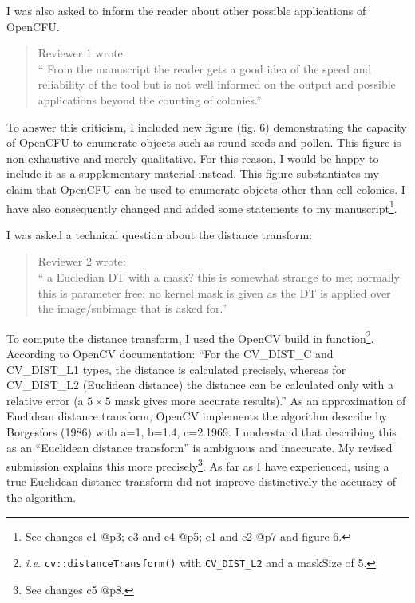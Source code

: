 \documentclass{letter}
\makeatletter
\newcommand{\CVersatDescrib}{c1 @p3; c3 and c4 @p5; c1 and c2 @p7 and figure 6}
\newcommand{\CDTDescrib}{c5 @p8}
\makeatother
\begin{document}
\begin{letter}{}
I was also asked to inform the reader about other possible applications
of OpenCFU.
\begin{quote}
Reviewer 1 wrote:\\
``  From the manuscript the reader gets a good idea of the speed and
 reliability of the tool but is not well 
informed on the output and possible applications beyond the counting of colonies.''
\end{quote}
To answer this criticism, I included 
new figure (fig. 6) demonstrating the capacity of OpenCFU to 
enumerate objects such as round seeds and pollen. This figure is
non exhaustive and 
merely qualitative. For this reason, I would be happy to 
include it as a supplementary material instead. 
This figure substantiates my claim that OpenCFU can be used to enumerate objects other than cell colonies. 
I have also consequently changed and added some statements to my manuscript\footnote{See changes \CVersatDescrib{}.}.

I was asked a technical question about the distance transform:
\begin{quote}
Reviewer 2 wrote:\\
`` a Eucledian DT with a mask? this is somewhat strange to me; 
normally this is parameter free; no kernel mask is given as the DT is applied over the image/subimage that is asked for.''
\end{quote}
 
 To compute the distance transform, I used the OpenCV build in 
 function\footnote{\emph{i.e.} \texttt{cv::distanceTransform()} with \texttt{CV\_DIST\_L2} and a maskSize of 5.}.
 According to OpenCV documentation: 
 ``For the CV\_DIST\_C and CV\_DIST\_L1 types, the distance is calculated precisely, whereas for CV\_DIST\_L2 (Euclidean distance) the distance can be calculated
  only with a relative error (a  $5\times5$ mask gives more accurate results).''
  As an approximation of Euclidean distance transform, OpenCV implements the algorithm
  describe by Borgesfors (1986) with a=1, b=1.4, c=2.1969. 
 I understand that describing this as an 
``Euclidean distance transform'' is ambiguous and inaccurate.
 My revised submission explains this more precisely\footnote{See changes \CDTDescrib{}.}. 
 As far as I have experienced, using a true Euclidean distance
 transform did not improve distinctively the accuracy 
of the algorithm.
  

\end{letter}
\end{document}
